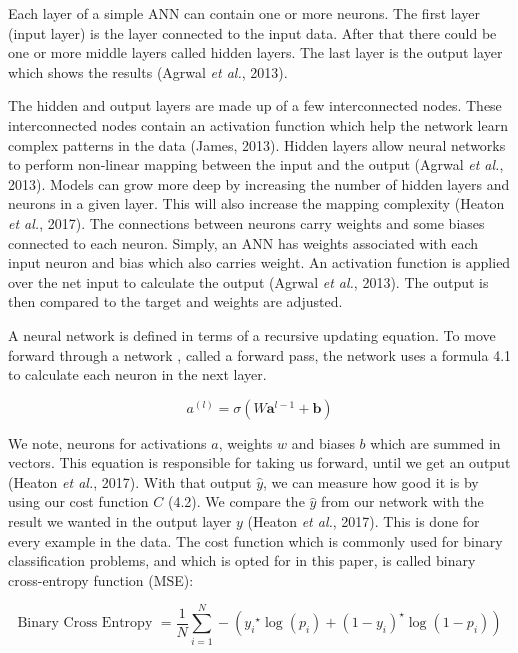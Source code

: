 Each layer of a simple ANN can contain one or more neurons. The first layer (input layer) is the layer connected to the input data. After that there could be one or more middle layers called hidden layers. The last layer is the output layer which shows the results (Agrwal \textit{et al.}, 2013).

The hidden and output layers are made up of a few interconnected nodes. These interconnected nodes contain an activation function which help the network learn complex patterns in the data (James, 2013). Hidden layers allow neural networks to perform non-linear mapping between the input and the output (Agrwal \textit{et al.}, 2013). Models can grow more deep by increasing the number of hidden layers and neurons in a given layer. This will also increase the mapping complexity (Heaton \textit{et al.}, 2017). The connections between neurons carry weights and some biases connected to each neuron. Simply, an ANN has weights associated with each input neuron and bias which also carries weight. An activation function is applied over the net input to calculate the output (Agrwal \textit{et al.}, 2013). The output is then compared to the target and weights are adjusted. 


A neural network is defined in terms of a recursive updating equation. To move forward through a network , called a forward pass, the network uses a formula 4.1 to calculate each neuron in the next layer. 

\begin{equation}
a^{(l)}=\sigma\left(W \boldsymbol{a}^{l-1}+\boldsymbol{b}\right)
\end{equation}

We note, neurons for activations $a$, weights $w$ and biases $b$ which are summed in vectors. This equation is responsible for taking us forward, until we get an output (Heaton \textit{et al.}, 2017). With that output $\hat{y}$, we can measure how good it is by using our cost function $C$ (4.2). We compare the $\hat{y}$ from our network with the result we wanted in the output layer $y$ (Heaton \textit{et al.}, 2017). This is done for every example in the data. The cost function which is commonly used for binary classification problems, and which is opted for in this paper, is called binary cross-entropy function (MSE):

\begin{equation}
\text {Binary Cross Entropy }=\frac{1}{N} \sum_{i=1}^{N}-\left(y_{i}{ }^{\star} \log \left(p_{i}\right)+\left(1-y_{i}\right)^{\star} \log \left(1-p_{i}\right)\right)
\end{equation}

